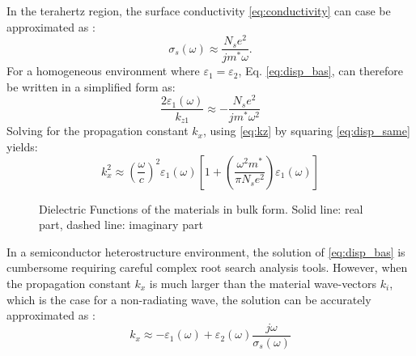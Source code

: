 \documentclass[conference, 10pt]{IEEEtran}
\renewcommand{\O}{\omega}  %
\newcommand{\E}{\varepsilon}  %
\renewcommand{\^}{\hat}  %
\begin{document}
%
In the terahertz region, the surface conductivity \eqref{eq:conductivity} can case be approximated as \cite{stern1967polarizability}:
%
\begin{equation}
  \sigma_s(\O) \approx \frac{N_s e^2}{j m^{\ast}\O}.
  \label{eq:conductivity_app}
\end{equation}
%
For a homogeneous environment where $\E_1 = \E_2$, Eq. \eqref{eq:disp_bas}, can therefore be written in a simplified form as:
%
\begin{equation}
  \frac{2 \E_1(\O)}{k_{z1}} \approx -\frac{N_s e^2}{j m^{\ast}\O^2}
  \label{eq:disp_same}
\end{equation}
%
Solving for the propagation constant $k_x$, using \eqref{eq:kz} by squaring \eqref{eq:disp_same} yields:
\begin{equation}
  k_x^2 \approx \left(\frac{\O}{c}\right)^2 \E_1(\O) \left[1 + \left(\frac{\O^2 m^{\ast}}{\pi N_s e^2}\right) \E_1(\O) \right]
  \label{eq:disp_same_final}
\end{equation}
%
\begin{figure*}[!t]
\centering
\subfloat[Case A]{
\label{fig:eps_Ga}}
\hfil
\subfloat[Case B]{
\label{fig:eps_Sto}}
  \caption{Dielectric Functions of the materials in bulk form. Solid line: real part, dashed line: imaginary part}
\label{fig:eps}
\end{figure*}
% 
In a semiconductor heterostructure environment, the solution of \eqref{eq:disp_bas} is cumbersome requiring careful complex root search analysis tools. However, when the propagation constant $k_x$ is much larger than the material wave-vectors $k_i$, which is the case for a non-radiating wave, the solution can be accurately approximated as \cite{jablan2009plasmonics}:
\begin{equation}
  k_x \approx - {\E_1(\O) + \E_2(\O)} \frac{j \O}{\sigma_s(\O)}
  \label{eq:disp_diff}
\end{equation}

\end{document}
